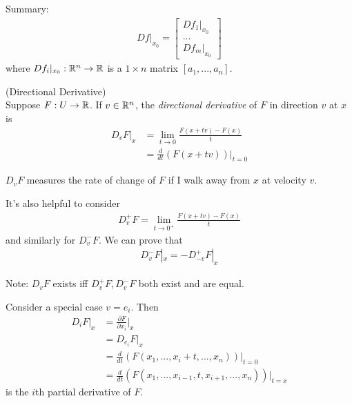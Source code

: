 \documentclass[a4paper]{article}
\begin{document}
Summary: 
\begin{equation*}
\begin{aligned}
Df|_{x_0} = \left[\begin{array}{ll}
Df_1|_{x_0}\\
...\\
Df_m|_{x_0}
\end{array}\right]
\end{aligned}
\end{equation*}
where $Df_i|_{x_0} : \mathbb{R}^n \to \mathbb{R}$ is a $1 \times n$ matrix $[a_1,...,a_n]$.

\begin{defi} (Directional Derivative)\\
Suppose $F:U\to\mathbb{R}$. If $v \in \mathbb{R}^n$, the \emph{directional derivative} of $F$ in direction $v$ at $x$ is
\begin{equation*}
\begin{aligned}
D_v F|_x &= \lim_{t \to 0} \frac{F(x+tv)-F(x)}{t}\\
&= \frac{d}{dt} (F(x+tv))|_{t=0}
\end{aligned}
\end{equation*}
\end{defi}

$D_v F$ measures the rate of change of $F$ if I walk away from $x$ at velocity $v$.

It's also helpful to consider
\begin{equation*}
\begin{aligned}
D_v^+ F = \lim_{t \to 0^+} \frac{F(x+tv)-F(x)}{t}
\end{aligned}
\end{equation*}
and similarly for $D_v^- F$. We can prove that
\begin{equation*}
\begin{aligned}
D_v^- F|_x = -D_{-v}^+ F|_x
\end{aligned}
\end{equation*}

Note: $D_v F$ exists iff $D_v^+ F, D_v^- F$ both exist and are equal.

\begin{eg}
Consider a special case $v=e_i$. Then
\begin{equation*}
\begin{aligned}
D_i F|_x &= \frac{\partial F}{\partial x_i}|_x\\
&=D_{e_i}F|_x\\
&=\frac{d}{dt} (F(x_1,...,x_i+t,...,x_n))|_{t=0}\\
&= \frac{d}{dt} (F(x_1,...,x_{i-1},t,x_{i+1},...,x_n))|_{t=x}
\end{aligned}
\end{equation*}
is the $i$th partial derivative of $F$.
\end{eg}
\end{document}
